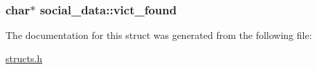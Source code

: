 \hypertarget{structsocial__data_a9a6909611ff90a480d9022a1213836d8}{
\subsubsection[{vict\-\_\-found}]{\setlength{\rightskip}{0pt plus 5cm}char$\ast$ social\-\_\-data\-::vict\-\_\-found}}\label{structsocial__data_a9a6909611ff90a480d9022a1213836d8}


The documentation for this struct was generated from the following file\-:\begin{DoxyCompactItemize}
\item 
\hyperlink{structs_8h}{structs.\-h}\end{DoxyCompactItemize}
